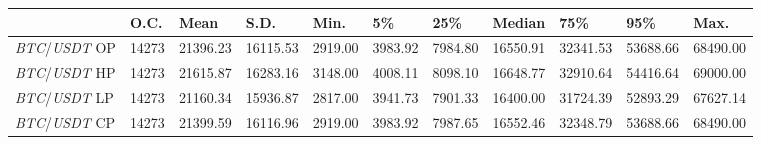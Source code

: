 \begin{tabular}{lllllllllll}
\toprule
 & \textbf{O.C.} & \textbf{Mean} & \textbf{S.D.} & \textbf{Min.} & \textbf{5\%} & \textbf{25\%} & \textbf{Median} & \textbf{75\%} & \textbf{95\%} & \textbf{Max.} \\
\midrule
\emph{BTC}/\emph{USDT} OP & 14273 & 21396.23 & 16115.53 & 2919.00 & 3983.92 & 7984.80 & 16550.91 & 32341.53 & 53688.66 & 68490.00 \\
\emph{BTC}/\emph{USDT} HP & 14273 & 21615.87 & 16283.16 & 3148.00 & 4008.11 & 8098.10 & 16648.77 & 32910.64 & 54416.64 & 69000.00 \\
\emph{BTC}/\emph{USDT} LP & 14273 & 21160.34 & 15936.87 & 2817.00 & 3941.73 & 7901.33 & 16400.00 & 31724.39 & 52893.29 & 67627.14 \\
\emph{BTC}/\emph{USDT} CP & 14273 & 21399.59 & 16116.96 & 2919.00 & 3983.92 & 7987.65 & 16552.46 & 32348.79 & 53688.66 & 68490.00 \\
\bottomrule
\end{tabular}
